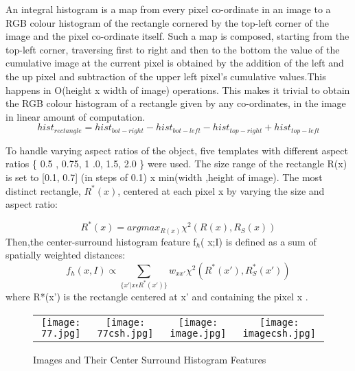 \documentclass[11pt]{report}
\begin{document}
An integral histogram is a map from every pixel co-ordinate in an image to a RGB colour histogram of the rectangle cornered by the top-left corner of the image and the pixel co-ordinate itself. Such a map is composed, starting from the top-left corner, traversing first to right and then to the bottom  the value of the cumulative image at the current pixel is obtained by the addition of the left and the up pixel and subtraction of the upper left pixel’s cumulative values.This happens in O(height x width of image) operations.
This makes it trivial to obtain the RGB colour histogram of a rectangle given by any co-ordinates, in the image in linear amount of computation.
\begin{equation}
hist_{rectangle} = hist_{bot-right} - hist_{bot-left} - hist_{top-right} + hist_{top-left}
\end{equation}


To handle varying aspect ratios of the object, five templates with different aspect ratios \{ 0.5 , 0.75, 1 .0, 1.5, 2.0 \} were used.
The size range of the rectangle R(x) is set to [0.1, 0.7] (in  steps of 0.1) x min(width ,height of image).
The most distinct rectangle, $R^*(x)$, centered at each pixel x by varying the size and aspect ratio:

\begin{equation}
R^*(x) = arg max_{R(x)} \chi^2(R(x),R_S(x))
\end{equation}
Then,the center-surround histogram feature f$_h$( x;I) is defined as a sum of spatially weighted distances:
\begin{equation}
f_h(x,I)  \propto \sum_{\{x'|x\epsilon R^*(x')\}} w_{xx'} \chi^2(R^*(x'),R^*_S(x'))
\end{equation} 
where R*(x') is the rectangle centered at x' and containing the pixel x .\\
\begin{figure}[h!]
\center
\begin{tabular}{cccc}
\texttt{[image: 77.jpg]} 
& \texttt{[image: 77csh.jpg]}
&
\texttt{[image: image.jpg]} & \texttt{[image: imagecsh.jpg]}
\end{tabular}
\label{tab:gt}
\caption{Images and Their Center Surround Histogram Features}
\end{figure}
\end{document}
